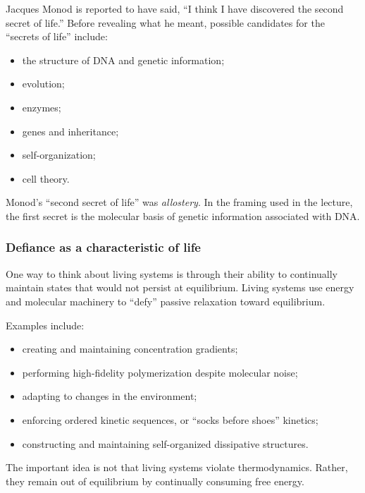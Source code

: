 Jacques Monod is reported to have said, ``I think I have discovered the second secret of life.''
Before revealing what he meant, possible candidates for the ``secrets of life'' include:

\begin{itemize}
    \item the structure of DNA and genetic information;
    \item evolution;
    \item enzymes;
    \item genes and inheritance;
    \item self-organization;
    \item cell theory.
\end{itemize}

Monod's ``second secret of life'' was \emph{allostery}.
In the framing used in the lecture, the first secret is the molecular basis of genetic information associated with DNA.


\subsubsection{Defiance as a characteristic of life}

One way to think about living systems is through their ability to continually maintain states that would not persist at equilibrium.
Living systems use energy and molecular machinery to ``defy'' passive relaxation toward equilibrium.

Examples include:

\begin{itemize}
    \item creating and maintaining concentration gradients;
    \item performing high-fidelity polymerization despite molecular noise;
    \item adapting to changes in the environment;
    \item enforcing ordered kinetic sequences, or ``socks before shoes'' kinetics;
    \item constructing and maintaining self-organized dissipative structures.
\end{itemize}

The important idea is not that living systems violate thermodynamics.
Rather, they remain out of equilibrium by continually consuming free energy.


